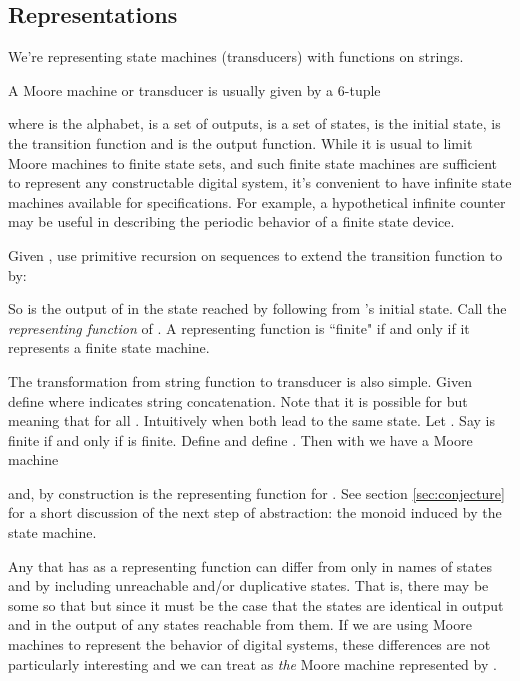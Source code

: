\documentclass[runningheads,letter]{llncs}
\begin{document}
\subsection{Representations}
We're representing state machines (transducers) with functions on strings.
\begin{center}
\end{center}

A Moore machine or transducer is usually given by a 6-tuple

where  is the alphabet,  is a set of outputs,  is a set of states,  is the initial
state,  is the transition function
and is the output function.
While it is usual to limit Moore machines to finite state sets, and such
finite state machines are sufficient to represent any constructable digital
system, it's convenient to have infinite state machines available for specifications. For example, a hypothetical infinite counter may be useful in describing the periodic
behavior of a finite state device. 

Given , use primitive recursion on sequences to 
extend  the transition function  to  by:


So  is
the output of  in the state reached by following  from 's initial
state.
Call  the 
\emph{representing function} of . A representing function is ``finite" if
and only if it represents a finite state machine. 

The transformation from string function to transducer is also simple.
Given  define   where  indicates string
concatenation. Note that it is possible for  but  meaning
that   for all
.  Intuitively  when both lead to the same state. Let .
Say  is finite if and only if  is finite. Define
 and define . Then
with  we have a Moore machine

and, by construction  is the representing function for . See section \ref{sec:conjecture} for a short
discussion of the next step of abstraction: the monoid induced by the state machine.

Any  that has  as a representing function can differ
from  only in names of states and by including unreachable and/or
duplicative states. That is, there may be some   so that
 but since  it must
be the case that the states are identical in output and in the output of any
states reachable from them. If we are using Moore machines to
represent the behavior of digital systems, these differences are not particularly interesting and we can treat  as \emph{the} Moore machine represented
by .
\end{document}
